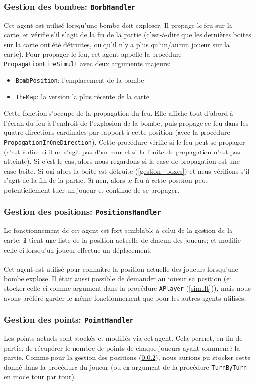 \documentclass{article}
\begin{document}
\subsubsection{Gestion des bombes: \texttt{BombHandler}}
\label{gestion_bombes}
Cet agent est utilisé lorsqu'une bombe doit exploser. Il propage le feu sur la carte, et vérifie s'il s'agit de la fin de la partie (c'est-à-dire que les dernières boites sur la carte ont été détruites, ou qu'il n'y a plus qu'un/aucun joueur sur la carte). Pour propager le feu, cet agent appelle la procédure \texttt{PropagationFireSimult} avec deux arguments majeurs: 
\begin{itemize}
	\item \texttt{BombPosition}: l'emplacement de la bombe
	\item \texttt{TheMap}: la version la plus récente de la carte
\end{itemize}
Cette fonction s'occupe de la propagation du feu. Elle affiche tout d'abord à l'écran du feu à l'endroit de l'explosion de la bombe, puis propage ce feu dans les quatre directions cardinales par rapport à cette position (avec la procédure \texttt{PropagationInOneDirection}). Cette procédure vérifie si le feu peut se propager (c'est-à-dire si il ne s'agit pas d'un mur et si la limite de propagation n'est pas atteinte). Si c'est le cas, alors nous regardons si la case de propagation est une case boite. Si oui alors la boite est détruite (\ref{gestion_boxes}) et nous vérifions s'il s'agit de la fin de la partie. Si non, alors le feu à cette position peut potentiellement tuer un joueur et continue de se propager.
\subsubsection{Gestion des positions: \texttt{PositionsHandler}}
\label{gestion_positions}
Le fonctionnement de cet agent est fort semblable à celui de la gestion de la carte: il tient une liste de la position actuelle de chacun des joueurs; et modifie celle-ci lorsqu'un joueur effectue un déplacement. \\ \\
Cet agent est utilisé pour connaitre la position actuelle des joueurs lorsqu'une bombe explose. Il était aussi possible de demander au joueur sa position (et stocker celle-ci comme argument dans la procédure \texttt{APlayer} (\ref{simult})), mais nous avons préféré garder le même fonctionnement que pour les autres agents utilisés.
\subsubsection{Gestion des points: \texttt{PointHandler}}
\label{gestion_points}
Les points actuels sont stockés et modifiés via cet agent. Cela permet, en fin de partie, de récupérer le nombre de points de chaque joueurs ayant commencé la partie. Comme pour la gestion des positions (\ref{gestion_positions}), nous aurions pu stocker cette donné dans la procédure du joueur (ou en argument de la procédure \texttt{TurnByTurn} en mode tour par tour).
\end{document}

